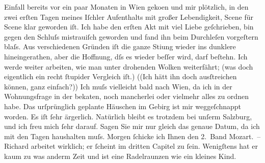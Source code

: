 \begin{ledgroupsized}[t]{13cm}
               Einfall bereits vor ein paar Monaten in Wien
                  geko{\geminationm}en und mir plötzlich, in den zwei erſten Tagen
               meines Iſchler {\pb}Aufenthalts mit großer Lebendigkeit, Scene für Scene klar geworden iſt. Ich habe
               den erſten Akt mit viel Liebe
               geſchrieben, bin gegen den Schluſs mistrauiſch geworden und fand ihn beim Durchleſen
               vorgeſtern blaſs. Aus verschiedenen Gründen iſt die ganze Sti{\geminationm}ung wieder ins dunklere hineingerathen, aber die
               Hoffnung, dſs es wieder beſſer wird, darf beſtehn. Ich werde weiter arbeiten, wie man
               unter drohenden Wolken weiterfährt; (was doch eigentlich ein recht ſtupider Vergleich
               iſt.) ((Ich hätt ihn doch ausſtreichen können, ganz einfach?)) \pend
           \pstart
           {\pb}Ich muſs vielleicht bald nach Wien, da ich in der Wohnungsfrage in der beka{\geminationn}ten, noch mancherlei oder vielmehr alles zu ordnen
               habe. Das urſprünglich geplante Häuschen im Gebirg ist mir weggeſchnappt worden. Es
               iſt ſehr ärgerlich. Natürlich bleibt es trotzdem bei unſerm Salzburg, und ich freu mich ſehr darauf. Sagen Sie mir nur
               gleich das genaue Datum, da ich mit den Tagen haushalten muſs.\pend
           \pstart
           Morgen ſchicke ich Ihnen den 2. Band Mozart. – Richard arbeitet wirklich; er ſcheint
               im dritten Capitel zu ſein.
                  {\pb}Wenigſtens hat er kaum zu was anderm Zeit und ist eine
               Radelraunzen wie ein kleines Kind.\pend

\end{ledgroupsized}
